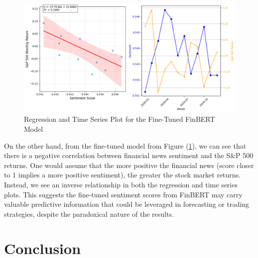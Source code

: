 \documentclass[12pt]{article}
\begin{document}
\begin{figure}[h]
	\centering
	\includegraphics[width=1\linewidth]{plots/regression_time_finetune.png}
	\caption{Regression and Time Series Plot for the Fine-Tuned FinBERT Model}
	\label{fig:finetune_time_regression}
\end{figure}


On the other hand, from the fine-tuned model from Figure (\ref{fig:finetune_time_regression}), we can see that there is a negative correlation between financial news sentiment and the S\&P 500 returns. One would assume that the more positive the financial news (score closer to 1 implies a more positive sentiment), the greater the stock market returns. Instead, we see an inverse relationship in both the regression and time series plots. This suggests the fine-tuned sentiment scores from FinBERT may carry valuable predictive information that could be leveraged in forecasting or trading strategies, despite the paradoxical nature of the results.


\section*{Conclusion}
\end{document}

